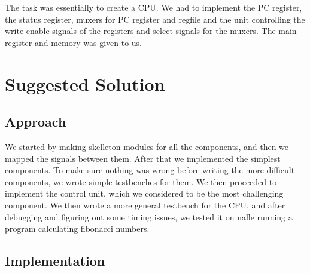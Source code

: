 \documentclass[10pt]{report}
\begin{document}
	The task was essentially to create a CPU. We had to implement the PC register, the status register, muxers for PC register and regfile and the unit controlling the write enable signals of the registers and select signals for the muxers. The main register and memory was given to us.

	\section*{Suggested Solution}


	\subsection*{Approach}

	We started by making skelleton modules for all the components, and then we mapped the signals between them. After that we implemented the simplest components. To make sure nothing was wrong before writing the more difficult components, we wrote simple testbenches for them. We then proceeded to implement the control unit, which we considered to be the most challenging component. We then wrote a more general testbench for the CPU, and after debugging and figuring out some timing issues, we tested it on nalle running a program calculating fibonacci numbers.

	\subsection*{Implementation}
\end{document}
